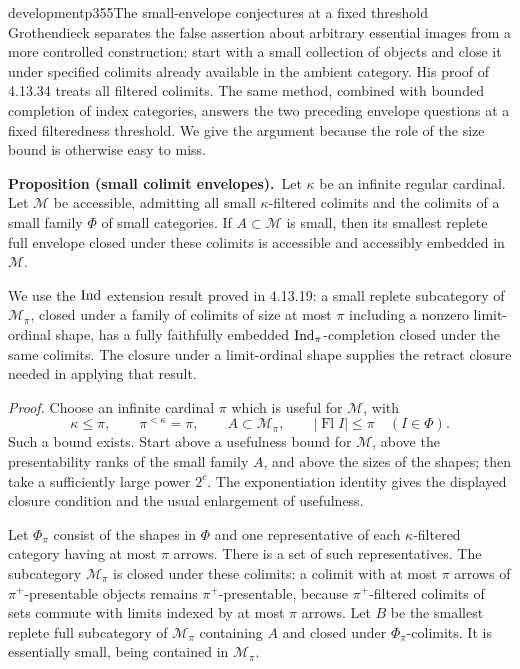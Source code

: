 
\begin{dcomment}{development}{p355}{The small-envelope conjectures at a fixed threshold}
Grothendieck separates the false assertion about arbitrary essential images from a more controlled construction: start with a small collection of objects and close it under specified colimits already available in the ambient category. His proof of 4.13.34 treats all filtered colimits. The same method, combined with bounded completion of index categories, answers the two preceding envelope questions at a fixed filteredness threshold. We give the argument because the role of the size bound is otherwise easy to miss.

\textbf{Proposition (small colimit envelopes).}\ours\
Let $\kappa$ be an infinite regular cardinal. Let $\mathcal M$ be accessible, admitting all small $\kappa$-filtered colimits and the colimits of a small family $\Phi$ of small categories. If $A\subset\mathcal M$ is small, then its smallest replete full envelope closed under these colimits is accessible and accessibly embedded in $\mathcal M$.

We use the $\operatorname{Ind}$ extension result proved in 4.13.19: a small replete subcategory of $\mathcal M_\pi$, closed under a family of colimits of size at most $\pi$ including a nonzero limit-ordinal shape, has a fully faithfully embedded $\operatorname{Ind}_\pi$-completion closed under the same colimits. The closure under a limit-ordinal shape supplies the retract closure needed in applying that result.

\textit{Proof.} Choose an infinite cardinal $\pi$ which is useful for $\mathcal M$, with
\[
 \kappa\leq\pi,\qquad \pi^{<\kappa}=\pi,
 \qquad A\subset\mathcal M_\pi,
 \qquad |\operatorname{Fl}I|\leq\pi\quad(I\in\Phi).
\]
Such a bound exists. Start above a usefulness bound for $\mathcal M$, above the presentability ranks of the small family $A$, and above the sizes of the shapes; then take a sufficiently large power $2^c$. The exponentiation identity gives the displayed closure condition and the usual enlargement of usefulness.

Let $\Phi_\pi$ consist of the shapes in $\Phi$ and one representative of each $\kappa$-filtered category having at most $\pi$ arrows. There is a set of such representatives. The subcategory $\mathcal M_\pi$ is closed under these colimits: a colimit with at most $\pi$ arrows of $\pi^+$-presentable objects remains $\pi^+$-presentable, because $\pi^+$-filtered colimits of sets commute with limits indexed by at most $\pi$ arrows. Let $B$ be the smallest replete full subcategory of $\mathcal M_\pi$ containing $A$ and closed under $\Phi_\pi$-colimits. It is essentially small, being contained in $\mathcal M_\pi$.


\end{dcomment}

